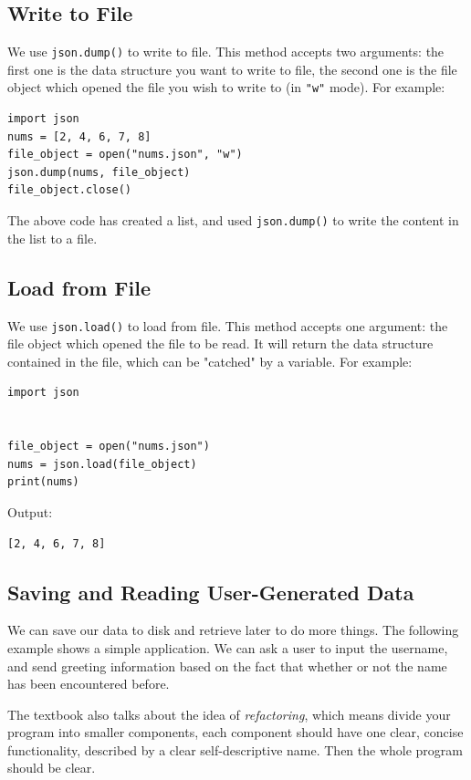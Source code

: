 \documentclass[12pt]{book}
\begin{document}
\subsection{Write to File}
\label{sec:org728e592}
We use \texttt{json.dump()} to write to file. This method accepts two arguments: the first one is the data structure you want to write to file, the second one is the file object which opened the file you wish to write to (in \texttt{"w"} mode). For example:
\begin{verbatim}
import json
nums = [2, 4, 6, 7, 8]
file_object = open("nums.json", "w")
json.dump(nums, file_object)
file_object.close()
\end{verbatim}
The above code has created a list, and used \texttt{json.dump()} to write the content in the list to a file.
\subsection{Load from File}
\label{sec:orgbfb3b04}
We use \texttt{json.load()} to load from file. This method accepts one argument: the file object which opened the file to be read. It will return the data structure contained in the file, which can be "catched" by a variable. For example:
\begin{verbatim}
import json


file_object = open("nums.json")
nums = json.load(file_object)
print(nums)
\end{verbatim}
Output:
\begin{verbatim}
[2, 4, 6, 7, 8]
\end{verbatim}
\subsection{Saving and Reading User-Generated Data}
\label{sec:org37bf8b6}
We can save our data to disk and retrieve later to do more things. The following example shows a simple application. We can ask a user to input the username, and send greeting information based on the fact that whether or not the name has been encountered before.

The textbook also talks about the idea of \emph{refactoring}, which means divide your program into smaller components, each component should have one clear, concise functionality, described by a clear self-descriptive name. Then the whole program should be clear.
\end{document}
